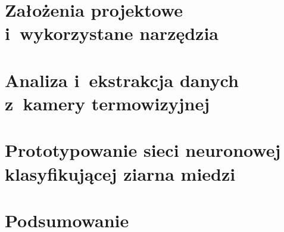\documentclass[a4paper, 12pt]{report}
\begin{document}
\chapter{Założenia projektowe i~wykorzystane narzędzia}


\chapter{Analiza i~ekstrakcja danych z~kamery termowizyjnej}


\chapter{Prototypowanie sieci neuronowej klasyfikującej ziarna miedzi}


\chapter{Podsumowanie} \label{ch:conclusions}


\listoffigures
\listoftables
\listoflistings

\nocite{*}


\end{document}

